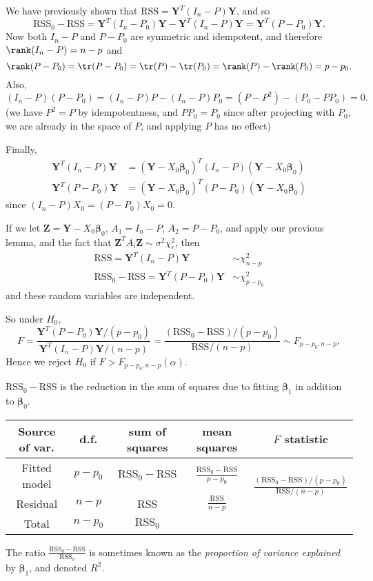 \documentclass[a4paper]{article}
\begin{document}
We have previously shown that $\mathrm{RSS} = \mathbf{Y}^T(I_n - P)\mathbf{Y}$, and so
\[
  \mathrm{RSS}_0 - \mathrm{RSS} = \mathbf{Y}^T(I_n - P_0)\mathbf{Y} - \mathbf{Y}^T(I_n - P)\mathbf{Y} = \mathbf{Y}^T(P - P_0)\mathbf{Y}.
\]
Now both $I_n - P$ and $P - P_0$ are symmetric and idempotent, and therefore $\rank(I_n - P) = n - p$ and
\[
  \rank(P - P_0) = \tr(P - P_0) = \tr(P) - \tr(P_0) = \rank(P) - \rank(P_0) = p - p_0.
\]
Also,
\[
  (I_n - P)(P - P_0) = (I_n - P)P - (I_n - P)P_0 = (P - P^2) - (P_0 - PP_0) = 0.
\]
(we have $P^2 = P$ by idempotentness, and $PP_0 = P_0$  since after projecting with $P_0$, we are already in the space of $P$, and applying $P$ has no effect)

Finally,
\begin{align*}
  \mathbf{Y}^T(I_n - P)\mathbf{Y} &= (\mathbf{Y} - X_0 \boldsymbol\beta_0)^T(I_n - P)(\mathbf{Y} - X_0 \boldsymbol\beta_0)\\
  \mathbf{Y}^T(P - P_0)\mathbf{Y} &= (\mathbf{Y} - X_0 \boldsymbol\beta_0)^T(P - P_0)(\mathbf{Y} - X_0 \boldsymbol\beta_0)
\end{align*}
since $(I_n - P)X_0 = (P - P_0)X_0 = 0$.

If we let $\mathbf{Z} = \mathbf{Y} - X_0 \boldsymbol\beta_0$, $A_1 = I_n - P$, $A_2 = P - P_0$, and apply our previous lemma, and the fact that $\mathbf{Z}^TA_i \mathbf{Z} \sim \sigma^2 \chi_r^2$, then
\begin{align*}
  \mathrm{RSS} = \mathbf{Y}^T(I_n - P)\mathbf{Y} &\sim \chi_{n - p}^2\\
  \mathrm{RSS}_0 - \mathrm{RSS} = \mathbf{Y}^T(P - P_0)\mathbf{Y} &\sim \chi^2_{p - p_0}
\end{align*}
and these random variables are independent.

So under $H_0$,
\[
  F = \frac{\mathbf{Y}^T(P - P_0)\mathbf{Y}/(p - p_0)}{\mathbf{Y}^T(I_n - P)\mathbf{Y}/(n - p)} = \frac{(\mathrm{RSS}_0 - \mathrm{RSS})/(p - p_0)}{\mathrm{RSS}/(n - p)} \sim F_{p - p_0, n - p},
\]
Hence we reject $H_0$ if $F > F_{p - p_0, n - p}(\alpha)$.

$\mathrm{RSS}_0 - \mathrm{RSS}$ is the reduction in the sum of squares due to fitting $\boldsymbol\beta_1$ in addition to $\boldsymbol\beta_0$.
\begin{center}
  \begin{tabular}{ccccc}
    \toprule
    Source of var. & d.f. & sum of squares & mean squares & $F$ statistic\\
    \midrule
    Fitted model & $p - p_0$ & $\mathrm{RSS}_0 - \mathrm{RSS}$ & $\frac{\mathrm{RSS}_0 - \mathrm{RSS}}{p - p_0}$ & \multirow{2}{*}{$\frac{(\mathrm{RSS}_0 - \mathrm{RSS})/(p - p_0)}{\mathrm{RSS}/(n - p)}$}\\
    Residual & $n - p$ & RSS & $\frac{\mathrm{RSS}}{n - p}$\\
    \midrule
    Total & $n - p_0$ & $\mathrm{RSS}_0$\\
    \bottomrule
  \end{tabular}
\end{center}
The ratio $\frac{\mathrm{RSS}_0 - \mathrm{RSS}}{\mathrm{RSS}_0}$ is sometimes known as the \emph{proportion of variance explained} by $\boldsymbol\beta_1$, and denoted $R^2$.
\end{document}
